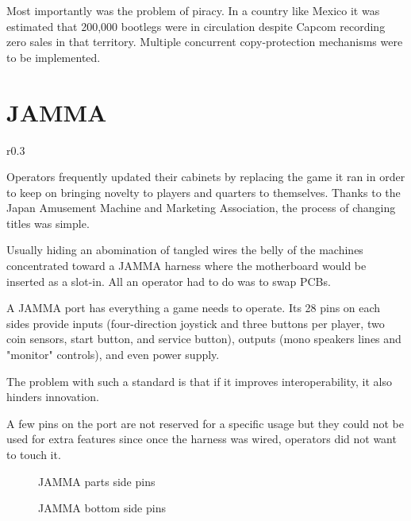 Most importantly was the problem of piracy. In a country like Mexico it was estimated that 200,000 bootlegs were in circulation\cite{sf2_oral_history} despite Capcom recording zero sales in that territory. Multiple concurrent copy-protection mechanisms were to be implemented.



\section{JAMMA}



\begin{wrapfigure}[19]{r}{0.3\textwidth}
\vspace{-\baselineskip}
\centering
\end{wrapfigure}


Operators frequently updated their cabinets by replacing the game it ran in order to keep on bringing novelty to players and quarters to themselves. Thanks to the Japan Amusement Machine and Marketing Association, the process of changing titles was simple. 

Usually hiding an abomination of tangled wires the belly of the machines concentrated toward a JAMMA harness where the motherboard would be inserted as a slot-in. All an operator had to do was to swap PCBs.

A JAMMA port has everything a game needs to operate. Its 28 pins on each sides provide inputs (four-direction joystick and three buttons per player, two coin sensors, start button, and service button), outputs (mono speakers lines and "monitor" controls), and even power supply.

The problem with such a standard is that if it improves interoperability, it also hinders innovation. 

A few pins on the port are not reserved for a specific usage but they could not be used for extra features since once the harness was wired, operators did not want to touch it.



 \begin{figure}[H]
\caption*{JAMMA parts side pins}
\end{figure}

 \begin{figure}[H]
\caption*{JAMMA bottom side pins}
\end{figure}



